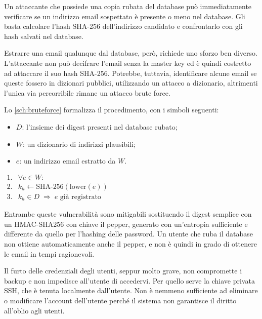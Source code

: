 Un attaccante che possiede una copia rubata del database può immediatamente verificare
se un indirizzo email sospettato è presente o meno nel database. Gli basta calcolare l'hash SHA-256
dell'indirizzo candidato e confrontarlo con gli hash salvati nel database.

Estrarre una email qualunque dal database, però, richiede uno sforzo ben diverso.
L'attaccante non può decifrare l'email senza la master key ed è quindi costretto ad attaccare il suo hash
SHA-256.
Potrebbe, tuttavia, identificare alcune email se queste fossero in dizionari pubblici, utilizzando un
attacco a dizionario, altrimenti l'unica via percorribile rimane un attacco brute force. 

Lo \autoref{sch:bruteforce} formalizza il procedimento, con i simboli seguenti:

\begin{itemize}
    \item $D$: l'insieme dei digest presenti nel database rubato;
    \item $W$: un dizionario di indirizzi plausibili;
    \item $e$: un indirizzo email estratto da $W$.
\end{itemize}

\begin{schema}
\centering
$\begin{array}{rl}
1. & \forall e \in W: \\[4pt]
2. & k_h \leftarrow \mathrm{SHA\mbox{-}256}(\mathrm{lower}(e)) \\[4pt]
3. & k_h \in D \;\Longrightarrow\; e \mbox{ già registrato}
\end{array}$
\caption{Ricerca di indirizzi registrati a partire dal database rubato, per dizionario o forza bruta.}
\label{sch:bruteforce}
\end{schema}

Entrambe queste vulnerabilità sono mitigabili sostituendo il digest semplice con un HMAC-SHA256 con chiave
il pepper, generato con un'entropia sufficiente e differente da quello per l'hashing delle password. 
Un utente che ruba il database non ottiene automaticamente anche il pepper, e non è quindi in grado di 
ottenere le email in tempi ragionevoli.

Il furto delle credenziali degli utenti, seppur molto grave, non compromette i backup e non impedisce 
all'utente di accedervi. Per quello serve la chiave privata SSH, che è tenuta localmente dall'utente.
Non è nemmeno sufficiente ad eliminare o modificare l'account dell'utente perché il sistema non 
garantisce il diritto all'oblio agli utenti.

